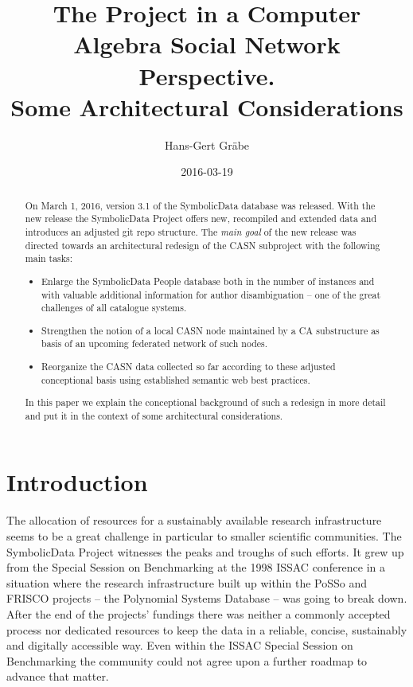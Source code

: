 \documentclass{llncs}
\title{The {\SD} Project in a Computer Algebra Social Network Perspective.\\
  Some Architectural Considerations}
\author{Hans-Gert Gr\"abe}
\institute{Leipzig University, Leipzig, Germany\\
\email{graebe@informatik.uni-leipzig.de}}
\date{2016-03-19}
\newcommand{\SD}{{\sc Symbo\-lic\-Data}}
\begin{document}
\maketitle

\begin{abstract}  
  On March 1, 2016, version 3.1 of the {\SD} data\-base was released. With the
  new release the {\SD} Project offers new, recompiled and extended data and
  introduces an adjusted git repo structure. The \emph{main goal} of the new
  release was directed towards an architectural redesign of the CASN
  subproject with the following main tasks:
\begin{itemize}
\item Enlarge the {\SD} People database both in the number of instances and
  with valuable additional information for author disambiguation -- one of the
  great challenges of all catalogue systems.
\item Strengthen the notion of a local CASN node maintained by a CA
  substructure as basis of an upcoming federated network of such nodes.
\item Reorganize the CASN data collected so far according to these adjusted
  conceptional basis using established semantic web best practices.
\end{itemize}
In this paper we explain the conceptional background of such a redesign in
more detail and put it in the context of some architectural considerations. 
\end{abstract}

\section{Introduction}
The allocation of resources for a sustainably available research
infrastructure seems to be a great challenge in particular to smaller
scientific communities. The {\SD} Project witnesses the peaks and troughs of
such efforts. It grew up from the Special Session on Benchmarking at the 1998
ISSAC conference in a situation where the research infrastructure built up
within the PoSSo \cite{PoSSo} and FRISCO \cite{FRISCO} projects -- the
Polynomial Systems Database -- was going to break down. After the end of the
projects' fundings there was neither a commonly accepted process nor dedicated
resources to keep the data in a reliable, concise, sustainably and digitally
accessible way. Even within the ISSAC Special Session on Benchmarking the
community could not agree upon a further roadmap to advance that matter.
\end{document}
